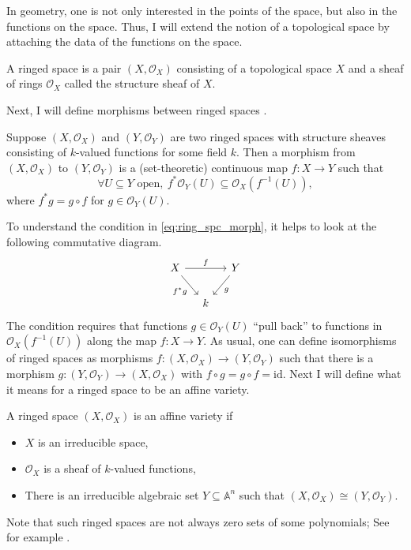 In geometry, one is not only interested in the points of the space,
but also in the functions on the space. Thus, I will extend the notion of
a topological space by attaching the data of the functions on the space.
\begin{defin}
  A ringed space is a pair $(X,\mathscr{O}_{X})$ consisting of a topological
  space $X$ and a sheaf of rings $\mathscr{O}_{X}$ called the structure
  sheaf of $X$.
\end{defin}
Next, I will define morphisms between ringed spaces \cite{gathmann}.
\begin{defin}
  Suppose $(X,\mathscr{O}_{X})$ and $(Y,\mathscr{O}_{Y})$ are two ringed
  spaces with structure sheaves consisting of $k$-valued functions
  for some field $k$. Then a morphism from $(X,\mathscr{O}_{X})$ to
  $(Y,\mathscr{O}_{Y})$ is a (set-theoretic) continuous map
  $f:X\to Y$ such that
  \begin{equation}\label{eq:ring_spc_morph}
    \forall U\subseteq Y\text{ open},\ f^{\ast}\mathscr{O}_{Y}(U)
    \subseteq \mathscr{O}_{X}(f^{-1}(U)),
  \end{equation}
  where $f^{\ast}g=g\circ f$ for $g\in\mathscr{O}_{Y}(U)$.
\end{defin}
To understand the condition in \eqref{eq:ring_spc_morph}, it helps to look
at the following commutative diagram.
\[\begin{tikzcd}[column sep=small]
    {X} && {Y} \\
    & k
    \arrow["{f^{\ast}g}"', from=1-1, to=2-2]
    \arrow["g", from=1-3, to=2-2]
    \arrow["f", from=1-1, to=1-3]
  \end{tikzcd}\]
The condition requires that functions $g\in\mathscr{O}_{Y}(U)$ ``pull back''
to functions in \linebreak $\mathscr{O}_{X}(f^{-1}(U))$ along the map $f:X\to Y$. As
usual, one can define isomorphisms of ringed spaces as morphisms
$f:(X,\mathscr{O}_{X})\to (Y,\mathscr{O}_{Y})$ such that there is a morphism
$g:(Y,\mathscr{O}_{Y})\to (X,\mathscr{O}_{X})$ with $f\circ g=g\circ f
=\text{id}$. Next I will define what it means for a ringed space to be
an affine variety.

\begin{defin}
  A ringed space $(X,\mathscr{O}_{X})$ is an affine variety if
  \begin{itemize}
    \item $X$ is an irreducible space,
    \item $\mathscr{O}_{X}$ is a sheaf of $k$-valued functions,
    \item There is an irreducible algebraic set $Y\subseteq \mathbb{A}^{n}$
          such that $(X,\mathscr{O}_{X})\cong (Y,\mathscr{O}_{Y})$.
  \end{itemize}
\end{defin}
Note that such ringed spaces are not always zero sets of some polynomials;
See for example \cite[Lemma~2.3.16]{gathmann}.

